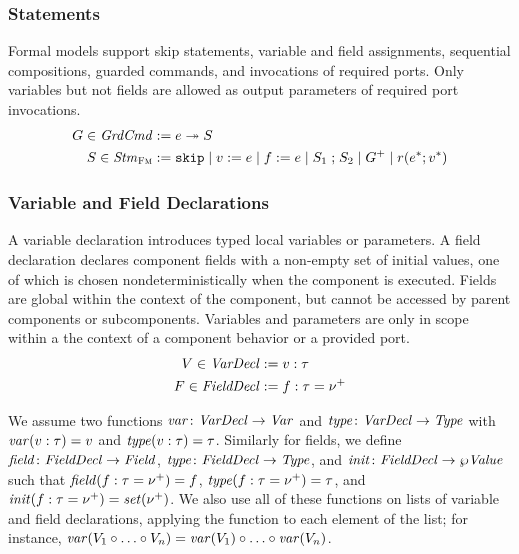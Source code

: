 \documentclass[a4paper,10pt,english]{article}
\begin{document}
\subsubsection{Statements}
Formal models support skip statements, variable and field assignments, sequential compositions, guarded commands, and
invocations of required ports. Only variables but not fields are allowed as output parameters of required port invocations.
\begin{align*}
	G \in \mathit{GrdCmd} &:= e \; \mathtt{\twoheadrightarrow} \; S \\
	S \in \mathit{Stm}_\textsc{Fm} &:=
		\mathtt{skip} \mid 
		v\; \mathtt{:=}\; e \mid
		f\; \mathtt{:=}\; e \mid
		S_1 \; \mathtt{;} \; S_2 \mid
		G^+ \mid
		r (e^*; v^*)
\end{align*}

\subsubsection{Variable and Field Declarations}
A variable declaration introduces typed local variables or parameters.
A field declaration declares component fields with a non-empty set of initial values, one of which is chosen
nondeterministically when the component is executed. Fields are global within the context of the component, but cannot be accessed
by parent components or subcomponents. Variables and parameters are only in scope within a the context of a component behavior or
a provided port.
\begin{align*}
	V \in \mathit{VarDecl} &:= v \; \mathtt{:} \; \tau \\
	F \in \mathit{FieldDecl} &:= f \; \mathtt{:} \; \tau \; \mathtt{=} \; \nu^+
\end{align*}

We assume two functions $\mathit{var} \colon \mathit{VarDecl} \rightarrow \mathit{Var}$ and $\mathit{type} \colon \mathit{VarDecl} \rightarrow \mathit{Type}$ with
$\mathit{var}(v \; \mathtt{:} \; \tau) = v$ and $\mathit{type}(v \; \mathtt{:} \; \tau) = \tau$. Similarly for fields, we define
$\mathit{field} \colon \mathit{FieldDecl} \rightarrow \mathit{Field}$, $\mathit{type} \colon \mathit{FieldDecl} \rightarrow \mathit{Type}$, and $\mathit{init} \colon \mathit{FieldDecl} \rightarrow
\wp \mathit{Value}$ such that $\mathit{field}(f \; \mathtt{:} \; \tau \; \mathtt{=} \; \nu^+) = f$,
$\mathit{type}(f \; \mathtt{:} \; \tau \; \mathtt{=} \; \nu^+) = \tau$, and
$\mathit{init}(f \; \mathtt{:} \; \tau \; \mathtt{=} \; \nu^+) = \mathit{set}(\nu^+)$. We also use all of these functions
on lists of variable and field declarations, applying the function to each element of the list; for instance, $\mathit{var}(V_1
\circ \ldots \circ V_n) = \mathit{var}(V_1) \circ \ldots \circ \mathit{var}(V_n)$.
\end{document}
